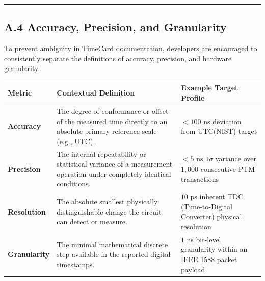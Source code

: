 \begin{center}\rule{0.5\linewidth}{0.5pt}\end{center}

\subsection{A.4 Accuracy, Precision, and
Granularity}\label{a.4-accuracy-precision-and-granularity}

To prevent ambiguity in TimeCard documentation, developers are
encouraged to consistently separate the definitions of accuracy,
precision, and hardware granularity.

{\def\LTcaptype{none} %
\begin{longtable}[]{@{}
  >{\raggedright\arraybackslash}p{}
  >{\raggedright\arraybackslash}p{}
  >{\raggedright\arraybackslash}p{}@{}}
\toprule\noalign{}
\begin{minipage}[b]{\linewidth}\raggedright
Metric
\end{minipage} & \begin{minipage}[b]{\linewidth}\raggedright
Contextual Definition
\end{minipage} & \begin{minipage}[b]{\linewidth}\raggedright
Example Target Profile
\end{minipage} \\
\midrule\noalign{}
\endhead
\bottomrule\noalign{}
\endlastfoot
\textbf{Accuracy} & The degree of conformance or offset of the measured
time directly to an absolute primary reference scale (e.g., UTC). &
\(<100\text{ ns}\) deviation from UTC(NIST) target \\
\textbf{Precision} & The internal repeatability or statistical variance
of a measurement operation under completely identical conditions. &
\(<5\text{ ns}\) \(1\sigma\) variance over \(1,\!000\) consecutive PTM
transactions \\
\textbf{Resolution} & The absolute smallest physically distinguishable
change the circuit can detect or measure. & \(10\text{ ps}\) inherent
TDC (Time-to-Digital Converter) physical resolution \\
\textbf{Granularity} & The minimal mathematical discrete step available
in the reported digital timestamps. & \(1\text{ ns}\) bit-level
granularity within an IEEE 1588 packet payload \\
\end{longtable}
}


